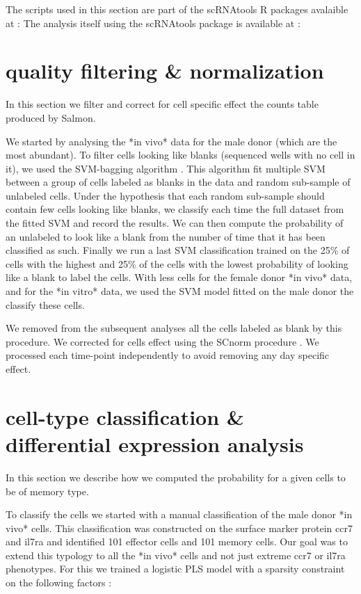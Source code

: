 \documentclass[a4paper,12pt]{article}
\begin{document}
The scripts used in this section are part of the scRNAtools R packages avalaible at :
The analysis itself using the scRNAtools package is available at :

\section{quality filtering \& normalization}

In this section we filter and correct for cell specific effect the counts table produced by Salmon.

We started by analysing the *in vivo* data for the male donor (which are the most abundant).
To filter cells looking like blanks (sequenced wells with no cell in it), we used the SVM-bagging algorithm \cite{mordeletBaggingSVMLearn2014b}.
This algorithm fit multiple SVM between a group of cells labeled as blanks in the data and random sub-sample of unlabeled cells.
Under the hypothesis that each random sub-sample should contain few cells looking like blanks, we classify each time the full dataset from the fitted SVM and record the results.
We can then compute the probability of an unlabeled to look like a blank from the number of time that it has been classified as such.
Finally we run a last SVM classification trained on the 25\% of cells with the highest and 25\% of the cells with the lowest probability of looking like a blank to label the cells.
With less cells for the female donor *in vivo* data, and for the *in vitro* data, we used the SVM model fitted on the male donor the classify these cells.

We removed from the subsequent analyses all the cells labeled as blank by this procedure.
We corrected for cells effect using the SCnorm procedure \cite{bacherSCnormRobustNormalization2017e}.
We processed each time-point independently to avoid removing any day specific effect.

\section{cell-type classification \& differential expression analysis}

In this section we describe how we computed the probability for a given cells to be of memory type.

To classify the cells we started with a manual classification of the male donor *in vivo* cells.
This classification was constructed on the surface marker protein ccr7 and il7ra and identified 101 effector cells and 101 memory cells.
Our goal was to extend this typology to all the *in vivo* cells and not just extreme ccr7 or il7ra phenotypes.
For this we trained a logistic PLS model with a sparsity constraint on the following factors \cite{durifHighDimensionalClassification2018}:
\end{document}
